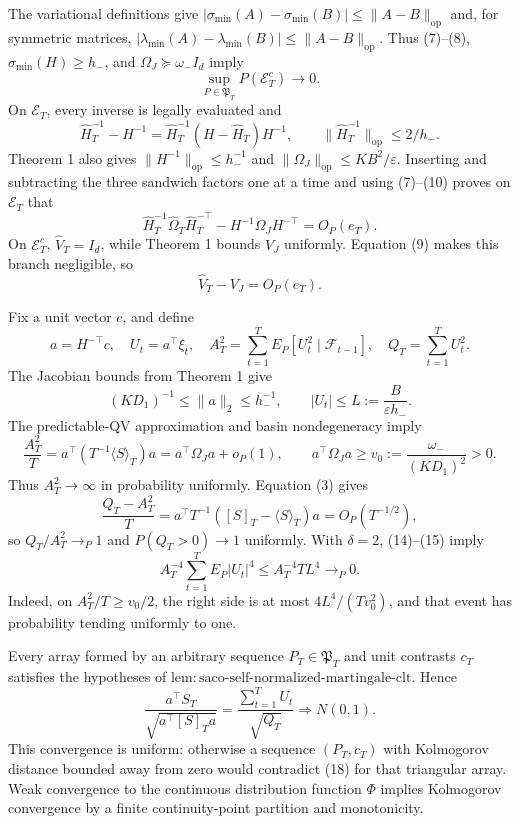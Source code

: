 The variational definitions give \(|\sigma_{\min}(A)-\sigma_{\min}(B)|\le\|A-B\|_{\mathrm{op}}\) and, for symmetric matrices, \(|\lambda_{\min}(A)-\lambda_{\min}(B)|\le\|A-B\|_{\mathrm{op}}\). Thus (7)--(8), \(\sigma_{\min}(H)\ge h_-\), and \(\Omega_J\succeq\omega_-I_d\) imply
\[
 \sup_{P\in\mathfrak P_T}P(\mathcal E_T^c)\longrightarrow0. \tag{9}
\]
On \(\mathcal E_T\), every inverse is legally evaluated and
\[
 \widehat H_T^{-1}-H^{-1}
 =\widehat H_T^{-1}(H-\widehat H_T)H^{-1},
 \qquad \|\widehat H_T^{-1}\|_{\mathrm{op}}\le2/h_-. \tag{10}
\]
Theorem 1 also gives \(\|H^{-1}\|_{\mathrm{op}}\le h_-^{-1}\) and \(\|\Omega_J\|_{\mathrm{op}}\le KB^2/\varepsilon\). Inserting and subtracting the three sandwich factors one at a time and using (7)--(10) proves on \(\mathcal E_T\) that
\[
 \widehat H_T^{-1}\widehat\Omega_T\widehat H_T^{-\top}
 -H^{-1}\Omega_JH^{-\top}=O_P(e_T). \tag{11}
\]
On \(\mathcal E_T^c\), \(\widehat V_T=I_d\), while Theorem 1 bounds \(V_J\) uniformly. Equation (9) makes this branch negligible, so
\[
\widehat V_T-V_J=O_P(e_T). \tag{12}
\]

Fix a unit vector \(c\), and define
\[
 a=H^{-\top}c,\quad U_t=a^\top\xi_t,\quad
 A_T^2=\sum_{t=1}^TE_P[U_t^2\mid\mathcal F_{t-1}],\quad
 Q_T=\sum_{t=1}^TU_t^2. \tag{13}
\]
The Jacobian bounds from Theorem 1 give
\[
 (KD_1)^{-1}\le\|a\|_2\le h_-^{-1},
 \qquad |U_t|\le L:=\frac{B}{\varepsilon h_-}. \tag{14}
\]
The predictable-QV approximation and basin nondegeneracy imply
\[
 \frac{A_T^2}{T}
 =a^\top(T^{-1}\langle S\rangle_T)a
 =a^\top\Omega_Ja+o_P(1),
 \qquad a^\top\Omega_Ja\ge v_0:=\frac{\omega_-}{(KD_1)^2}>0. \tag{15}
\]
Thus \(A_T^2\to\infty\) in probability uniformly. Equation (3) gives
\[
 \frac{Q_T-A_T^2}{T}
 =a^\top T^{-1}([S]_T-\langle S\rangle_T)a
 =O_P(T^{-1/2}), \tag{16}
\]
so \(Q_T/A_T^2\to_P1\) and \(P(Q_T>0)\to1\) uniformly. With \(\delta=2\), (14)--(15) imply
\[
 A_T^{-4}\sum_{t=1}^TE_P|U_t|^4
 \le A_T^{-4}TL^4\longrightarrow_P0. \tag{17}
\]
Indeed, on \(A_T^2/T\ge v_0/2\), the right side is at most \(4L^4/(Tv_0^2)\), and that event has probability tending uniformly to one.

Every array formed by an arbitrary sequence \(P_T\in\mathfrak P_T\) and unit contrasts \(c_T\) satisfies the hypotheses of \(\mathrm{lem:saco\text{-}self\text{-}normalized\text{-}martingale\text{-}clt}\). Hence
\[
 \frac{a^\top S_T}{\sqrt{a^\top[S]_Ta}}
 =\frac{\sum_{t=1}^TU_t}{\sqrt{Q_T}}\Rightarrow N(0,1). \tag{18}
\]
This convergence is uniform: otherwise a sequence \((P_T,c_T)\) with Kolmogorov distance bounded away from zero would contradict (18) for that triangular array. Weak convergence to the continuous distribution function \(\Phi\) implies Kolmogorov convergence by a finite continuity-point partition and monotonicity.

